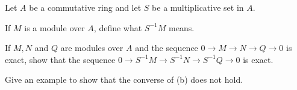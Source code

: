 Let $A$ be a commutative ring and let $S$ be a multiplicative set in
$A$.
\begin{alist}
\item If $M$ is a module over $A$, define what $S^{-1}M$ means.
\item If $M,N$ and $Q$ are modules over $A$ and the sequence
$0\rightarrow M\rightarrow N\rightarrow Q\rightarrow 0$ is exact, show
that the sequence $0\rightarrow S^{-1} M \rightarrow S^{-1}N
\rightarrow S^{-1}Q\rightarrow 0$ is exact.
\item Give an example to show that the converse of (b) does
not hold.
\end{alist}
